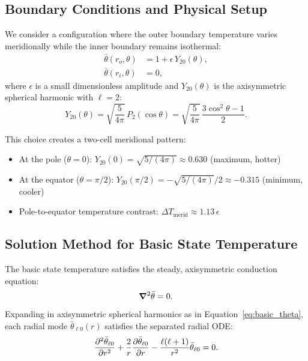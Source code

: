 \documentclass[11pt]{article}
\numberwithin{equation}{section}
\begin{document}
\subsection{Boundary Conditions and Physical Setup}

We consider a configuration where the outer boundary temperature varies meridionally while the inner boundary remains isothermal:
\begin{align}
  \bar{\theta}(r_o, \theta) &= 1 + \epsilon \, Y_{20}(\theta), \label{eq:bc_outer} \\
  \bar{\theta}(r_i, \theta) &= 0, \label{eq:bc_inner}
\end{align}
where $\epsilon$ is a small dimensionless amplitude and $Y_{20}(\theta)$ is the axisymmetric spherical harmonic with $\ell=2$:
\begin{equation}
  Y_{20}(\theta) = \sqrt{\frac{5}{4\pi}} \, P_2(\cos\theta) = \sqrt{\frac{5}{4\pi}} \, \frac{3\cos^2\theta - 1}{2}.
  \label{eq:Y20}
\end{equation}

This choice creates a two-cell meridional pattern:
\begin{itemize}
  \item At the pole ($\theta=0$): $Y_{20}(0) = \sqrt{5/(4\pi)} \approx 0.630$ (maximum, hotter)
  \item At the equator ($\theta=\pi/2$): $Y_{20}(\pi/2) = -\sqrt{5/(4\pi)}/2 \approx -0.315$ (minimum, cooler)
  \item Pole-to-equator temperature contrast: $\Delta T_{\text{merid}} \approx 1.13\,\epsilon$
\end{itemize}

\subsection{Solution Method for Basic State Temperature}

The basic state temperature satisfies the steady, axisymmetric conduction equation:
\begin{equation}
  \grad^2 \bar{\theta} = 0.
  \label{eq:laplace_basic}
\end{equation}

Expanding in axisymmetric spherical harmonics as in Equation~\eqref{eq:basic_theta}, each radial mode $\bar{\theta}_{\ell 0}(r)$ satisfies the separated radial ODE:
\begin{equation}
  \pdv[2]{\bar{\theta}_{\ell 0}}{r} + \frac{2}{r} \pdv{\bar{\theta}_{\ell 0}}{r} - \frac{\ell(\ell+1)}{r^2} \bar{\theta}_{\ell 0} = 0.
  \label{eq:laplace_radial}
\end{equation}
\end{document}
